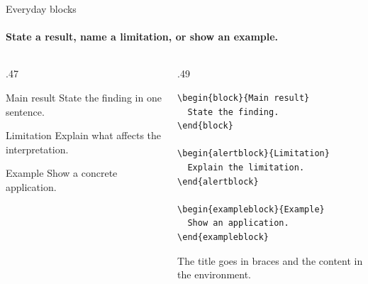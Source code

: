 \begin{frame}[fragile]{Everyday blocks}
  \framesubtitle{State a result, name a limitation, or show an example.}
  \small
  \begin{columns}[T,onlytextwidth]
    \begin{column}{.47\textwidth}
      \begin{block}{Main result}
        State the finding in one sentence.
      \end{block}
      \begin{alertblock}{Limitation}
        Explain what affects the interpretation.
      \end{alertblock}
      \begin{exampleblock}{Example}
        Show a concrete application.
      \end{exampleblock}
    \end{column}
    \begin{column}{.49\textwidth}
      {\footnotesize
\begin{verbatim}
\begin{block}{Main result}
  State the finding.
\end{block}

\begin{alertblock}{Limitation}
  Explain the limitation.
\end{alertblock}

\begin{exampleblock}{Example}
  Show an application.
\end{exampleblock}
\end{verbatim}
      }
      \smallskip
      The title goes in braces and the content in the environment.
    \end{column}
  \end{columns}
\end{frame}

